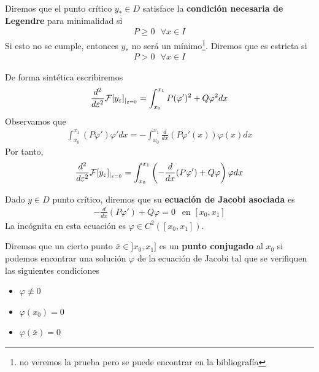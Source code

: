 \begin{definicion}
    Diremos que el punto crítico $y_*\in D$ satisface la \textbf{condición necesaria de Legendre} para minimalidad si 
    \begin{gather*}
        P \geq 0\ \ \ \forall x \in  I
    \end{gather*}
    Si esto no se cumple, entonces $y_*$ no será un mínimo\footnote{no veremos la prueba pero se puede encontrar en la bibliografía}. Diremos que es estricta si 
    \begin{gather*}
        P > 0\ \ \ \forall x \in  I
    \end{gather*}
\end{definicion}

De forma sintética escribiremos
\begin{gather*}
    \frac{d^2}{d\varepsilon^2}\mathcal{F}[y_\varepsilon]_{|_{\varepsilon=0}} = \int_{x_0}^{x_1} P(\varphi')^2 + Q\varphi^2 dx
\end{gather*}
Observamos que 
\begin{gather*}
    \int_{x_0}^{x_1} (P\varphi')\varphi' dx = -\int_{x_0}^{x_1} \frac{d}{dx} (P\varphi'(x)) \varphi(x) dx
\end{gather*}
Por tanto,
\begin{gather*}
    \frac{d^2}{d\varepsilon^2}\mathcal{F}[y_\varepsilon]_{|_{\varepsilon=0}} = \int_{x_0}^{x_1} \left( -\frac{d}{dx} (P\varphi') + Q\varphi \right) \varphi dx
\end{gather*}

\begin{definicion}
    Dado $y\in D$ punto crítico, diremos que su \textbf{ecuación de Jacobi asociada} es 
    \begin{gather*}
        -\frac{d}{dx}(P\varphi') + Q\varphi = 0 \ \ \text{ en } [x_0, x_1]
    \end{gather*}
    La incógnita en esta ecuación es $\varphi\in C^2([x_0, x_1])$.
\end{definicion}

\begin{definicion}
    Diremos que un cierto punto $\bar{x}\in ]x_0, x_1]$ es un \textbf{punto conjugado} al $x_0$ si podemos encontrar una solución $\varphi$ de la ecuación de Jacobi tal que  se verifiquen las siguientes condiciones
    \begin{itemize}
        \item $\varphi \not\equiv 0$
        \item $\varphi(x_0)=0$
        \item $\varphi(\bar{x})=0$
    \end{itemize}
\end{definicion}

